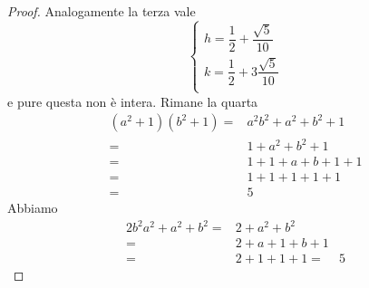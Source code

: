 \begin{proof}
Analogamente la terza vale \[\left\{
\begin{array}{l}
	h=\dfrac{1}{2}+\dfrac{\sqrt{5}}{10}\\
	k=\dfrac{1}{2}+3\dfrac{\sqrt{5}}{10}\\
\end{array}
\right.\]
e pure questa non è intera. Rimane la quarta
\begin{align*}
(a^2+1)(b^2+1)=&a^2b^2+a^2+b^2+1\\
=&1+a^2+b^2+1\\
=&1+1+a+b+1+1\\
=&1+1+1+1+1\\
=&5
\end{align*}
Abbiamo
\begin{align*}
	2b^2a^2+a^2+b^2=&2+a^2+b^2\\
	=&2+a+1+b+1\\
	=&2+1+1+1
	=&5
\end{align*}
\end{proof}